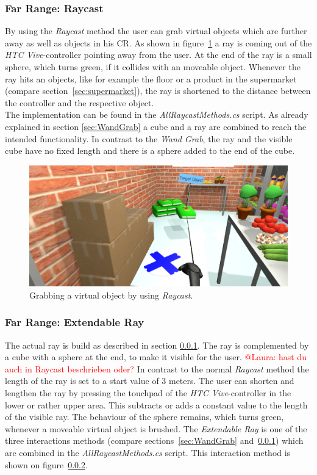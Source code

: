 \subsubsection{Far Range: Raycast} \label{sec:Raycast}
By using the \textit{Raycast} method the user can grab virtual objects which are further away as well as objects in his CR. As shown in figure~\ref{fig:raycast} a ray is coming out of the \textit{HTC Vive}-controller pointing away from the user. At the end of the ray is a small sphere, which turns green, if it collides with an moveable object. Whenever the ray hits an objects, like for example the floor or a product in the supermarket (compare section~\ref{sec:supermarket}), the ray is shortened to the distance between the controller and the respective object. \\
The implementation can be found in the \textit{AllRaycastMethods.cs} script. As already explained in section \ref{sec:WandGrab} a cube and a ray are combined to reach the intended functionality. In contrast to the \textit{Wand Grab}, the ray and the visible cube have no fixed length and there is a sphere added to the end of the cube.

\begin{figure}[H] 
	\center 
	\includegraphics[width=12cm]{Images/Raycast.PNG}			
	\caption[Grabbing a virtual object by using \textit{Raycast}.]{Grabbing a virtual object by using \textit{Raycast}.}
	\label{fig:raycast}
\end{figure}


\subsubsection{Far Range: Extendable Ray} \label{sec:ExtendableRay}
The actual ray is build as described in section \ref{sec:Raycast}. The ray \cite{website:Ray} is complemented by a cube with a sphere at the end, to make it visible for the user. \textcolor{red}{@Laura: hast du auch in Raycast beschrieben oder?} In contrast to the normal \textit{Raycast} method the length of the ray is set to a start value of 3 meters. The user can shorten and lengthen the ray by pressing the touchpad of the \textit{HTC Vive}-controller in the lower or rather upper area. This subtracts or adds a constant value to the length of the visible ray. The behaviour of the sphere remains, which turns green, whenever a moveable virtual object is brushed. The \textit{Extendable Ray} is one of the three interactions methods (compare sections~\ref{sec:WandGrab} and~\ref{sec:Raycast}) which are combined in the \textit{AllRaycastMethods.cs} script. This interaction method is shown on figure~\ref{sec:ExtendableRay}.

